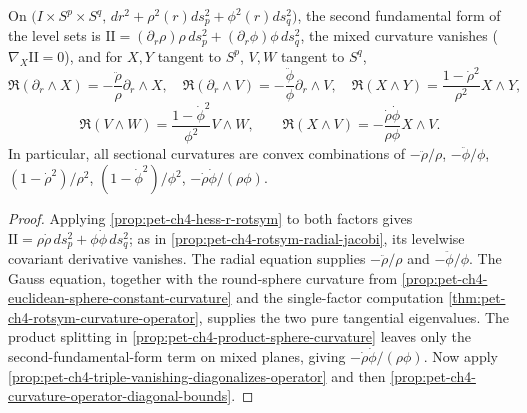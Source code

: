 \begin{theorem}
  \label{thm:pet-ch4-doubly-warped-curvature}

  On $\big(I\times S^p\times S^q,\,dr^2+\rho^2(r)ds_p^2+\phi^2(r)ds_q^2\big)$, the
  second fundamental form of the level sets is
  $\mathrm{II}=(\partial_r\rho)\rho\,ds_p^2+(\partial_r\phi)\phi\,ds_q^2$, the mixed
  curvature vanishes ($\nabla_X\mathrm{II}=0$), and for $X,Y$ tangent to $S^p$,
  $V,W$ tangent to $S^q$,
  \[
    \mathfrak{R}(\partial_r\wedge X)=-\frac{\ddot\rho}\rho\partial_r\wedge X,\quad
    \mathfrak{R}(\partial_r\wedge V)=-\frac{\ddot\phi}\phi\partial_r\wedge V,\quad
    \mathfrak{R}(X\wedge Y)=\frac{1-\dot\rho^2}{\rho^2}X\wedge Y,
  \]
  \[
    \mathfrak{R}(V\wedge W)=\frac{1-\dot\phi^2}{\phi^2}V\wedge W,\qquad
    \mathfrak{R}(X\wedge V)=-\frac{\dot\rho\dot\phi}{\rho\phi}X\wedge V.
  \]
  In particular, all sectional curvatures are convex combinations of
  $-\ddot\rho/\rho$, $-\ddot\phi/\phi$, $(1-\dot\rho^2)/\rho^2$,
  $(1-\dot\phi^2)/\phi^2$, $-\dot\rho\dot\phi/(\rho\phi)$.
\end{theorem}
\begin{proof}
  \sketch
  Applying \cref{prop:pet-ch4-hess-r-rotsym} to both factors gives
  $\mathrm{II}=\rho\dot\rho\,ds_p^2+\phi\dot\phi\,ds_q^2$; as in
  \cref{prop:pet-ch4-rotsym-radial-jacobi}, its levelwise covariant derivative
  vanishes. The radial equation supplies $-\ddot\rho/\rho$ and
  $-\ddot\phi/\phi$. The Gauss equation, together with the round-sphere
  curvature from \cref{prop:pet-ch4-euclidean-sphere-constant-curvature} and
  the single-factor computation \cref{thm:pet-ch4-rotsym-curvature-operator},
  supplies the two pure tangential eigenvalues. The product splitting in
  \cref{prop:pet-ch4-product-sphere-curvature} leaves only the second-fundamental-form
  term on mixed planes, giving $-\dot\rho\dot\phi/(\rho\phi)$. Now apply
  \cref{prop:pet-ch4-triple-vanishing-diagonalizes-operator} and then
  \cref{prop:pet-ch4-curvature-operator-diagonal-bounds}.
\end{proof}

